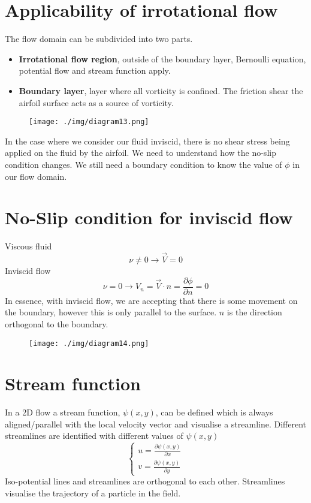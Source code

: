 \section{Applicability of irrotational flow}
The flow domain can be subdivided into two parts.
\begin{itemize}
  \item \textbf{Irrotational flow region}, outside of the boundary layer, Bernoulli equation, potential flow and stream function apply.
  \item \textbf{Boundary layer}, layer where all vorticity is confined. The friction shear the airfoil surface acts as a source of vorticity.
\end{itemize}
\begin{figure}[H]
  \centering
  \texttt{[image: ./img/diagram13.png]}
\end{figure}
In the case where we consider our fluid inviscid, there is no shear stress being applied on the fluid by the airfoil. We need to understand how the no-slip condition changes. We still need a boundary condition to know the value of $\phi$ in our flow domain.
\section{No-Slip condition for inviscid flow}
Viscous fluid
\begin{equation}
  \nu \neq 0 \rightarrow \vec{V} = 0
\end{equation}
Inviscid flow
\begin{equation}
  \nu = 0 \rightarrow V_n = \vec{V} \cdot \hat{n} = \frac{\partial \phi}{\partial n} = 0
\end{equation}
In essence, with inviscid flow, we are accepting that there is some movement on the boundary, however this is only parallel to the surface. $n$ is the direction orthogonal to the boundary.
\begin{figure}[H]
  \centering
  \texttt{[image: ./img/diagram14.png]}
\end{figure}
\section{Stream function}
In a 2D flow a stream function, $\psi(x, y)$, can be defined which is always aligned/parallel with the local velocity vector and visualise a streamline. Different streamlines are identified with different values of $\psi (x,y)$
\begin{equation}
  \begin{cases}
    u = \frac{\partial \psi(x,y)}{\partial x} \\
    v = \frac{\partial \psi(x,y)}{\partial y}
  \end{cases}
\end{equation}
Iso-potential lines and streamlines are orthogonal to each other. Streamlines visualise the trajectory of a particle in the field.
